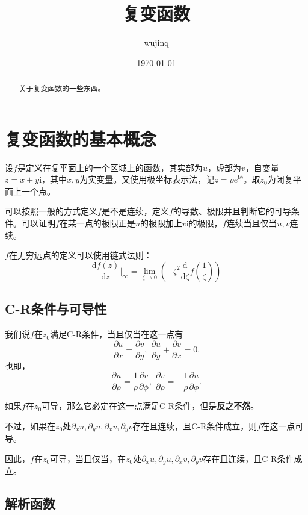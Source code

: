 \documentclass[UTF8]{ctexart}
\title{复变函数}
\author{wujinq}
\date{\today}
\begin{document}
\maketitle

\begin{abstract}
    关于复变函数的一些东西。
\end{abstract}

\section{复变函数的基本概念}

设$f$是定义在复平面上的一个区域上的函数，其实部为$u$，虚部为$v$，自变量$z = x + y \mathrm{i}$，其中$x,y$为实变量。又使用极坐标表示法，记$z = \rho e^{\mathrm{i}\phi}$。取$z_0$为闭复平面上一个点。

可以按照一般的方式定义$f$是不是连续，定义$f$的导数、极限并且判断它的可导条件。可以证明$f$在某一点的极限正是$u$的极限加上$v\mathrm{i}$的极限，$f$连续当且仅当$u,v$连续。

$f$在无穷远点的定义可以使用链式法则： \[
\frac{\mathrm{d} f(z)}{\mathrm{d} z} \bigg |_{\infty} = \lim_{\zeta \rightarrow 0} \left( - \zeta^2 \frac{\mathrm{d}}{\mathrm{d} \zeta} f \left( \frac{1}{\zeta} \right) \right)
\]

\hypertarget{c-rux6761ux4ef6ux4e0eux53efux5bfcux6027}{%
\subsection{C-R条件与可导性}\label{c-rux6761ux4ef6ux4e0eux53efux5bfcux6027}}

我们说$f$在$z_0$满足C-R条件，当且仅当在这一点有 \[
\frac{\partial u}{\partial x} = \frac{\partial v}{\partial y}, \; \frac{\partial u}{\partial y} + \frac{\partial v}{\partial x} = 0.
\] 也即， \[
\frac{\partial u}{\partial \rho} = \frac{1}{\rho} \frac{\partial v}{\partial \phi}, \; \frac{\partial v}{\partial \rho} = - \frac{1}{\rho} \frac{\partial u}{\partial \phi}.
\]

如果$f$在$z_0$可导，那么它必定在这一点满足C-R条件，但是\textbf{反之不然}。

不过，如果在$z_0$处$\partial_x u, \partial_y u, \partial_x v, \partial_y v$存在且连续，且C-R条件成立，则$f$在这一点可导。

因此，$f$在$z_0$可导，当且仅当，在$z_0$处$\partial_x u, \partial_y u, \partial_x v, \partial_y v$存在且连续，且C-R条件成立。

\hypertarget{ux89e3ux6790ux51fdux6570}{%
\subsection{解析函数}\label{ux89e3ux6790ux51fdux6570}}
\end{document}
